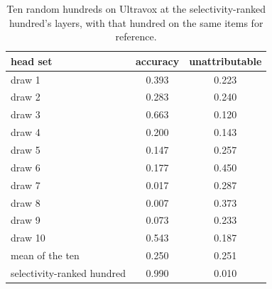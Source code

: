 \documentclass[11pt]{article}
\begin{document}
\begin{table}[H]\centering\small
\begin{tabular}{lcc}
\toprule
head set & accuracy & unattributable \\
\midrule
draw 1  & 0.393 & 0.223 \\
draw 2  & 0.283 & 0.240 \\
draw 3  & 0.663 & 0.120 \\
draw 4  & 0.200 & 0.143 \\
draw 5  & 0.147 & 0.257 \\
draw 6  & 0.177 & 0.450 \\
draw 7  & 0.017 & 0.287 \\
draw 8  & 0.007 & 0.373 \\
draw 9  & 0.073 & 0.233 \\
draw 10 & 0.543 & 0.187 \\
\midrule
mean of the ten & 0.250 & 0.251 \\
\midrule
selectivity-ranked hundred & 0.990 & 0.010 \\
\bottomrule
\end{tabular}
\caption{Ten random hundreds on Ultravox at the selectivity-ranked hundred's
layers, with that hundred on the same items for reference.}
\label{tab:app-ten}
\end{table}
\end{document}
